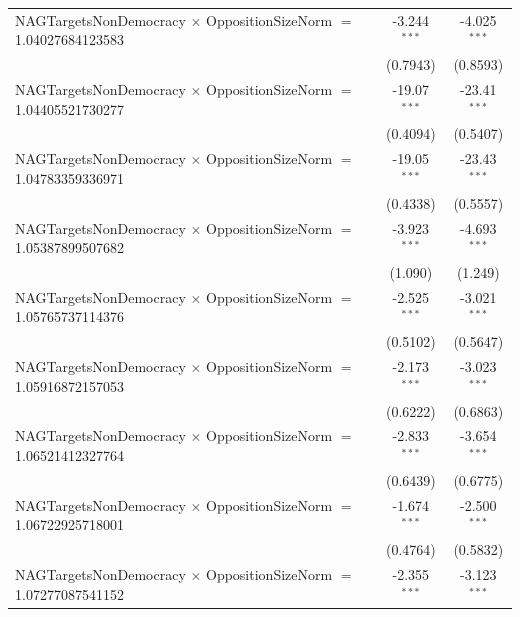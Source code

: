 \begin{tabular}{lcc}
   NAGTargetsNonDemocracy $\times$ OppositionSizeNorm $=$ 1.04027684123583      & -3.244$^{***}$       & -4.025$^{***}$\\   
                                                                                & (0.7943)             & (0.8593)\\   
   NAGTargetsNonDemocracy $\times$ OppositionSizeNorm $=$ 1.04405521730277      & -19.07$^{***}$       & -23.41$^{***}$\\   
                                                                                & (0.4094)             & (0.5407)\\   
   NAGTargetsNonDemocracy $\times$ OppositionSizeNorm $=$ 1.04783359336971      & -19.05$^{***}$       & -23.43$^{***}$\\   
                                                                                & (0.4338)             & (0.5557)\\   
   NAGTargetsNonDemocracy $\times$ OppositionSizeNorm $=$ 1.05387899507682      & -3.923$^{***}$       & -4.693$^{***}$\\   
                                                                                & (1.090)              & (1.249)\\   
   NAGTargetsNonDemocracy $\times$ OppositionSizeNorm $=$ 1.05765737114376      & -2.525$^{***}$       & -3.021$^{***}$\\   
                                                                                & (0.5102)             & (0.5647)\\   
   NAGTargetsNonDemocracy $\times$ OppositionSizeNorm $=$ 1.05916872157053      & -2.173$^{***}$       & -3.023$^{***}$\\   
                                                                                & (0.6222)             & (0.6863)\\   
   NAGTargetsNonDemocracy $\times$ OppositionSizeNorm $=$ 1.06521412327764      & -2.833$^{***}$       & -3.654$^{***}$\\   
                                                                                & (0.6439)             & (0.6775)\\   
   NAGTargetsNonDemocracy $\times$ OppositionSizeNorm $=$ 1.06722925718001      & -1.674$^{***}$       & -2.500$^{***}$\\   
                                                                                & (0.4764)             & (0.5832)\\   
   NAGTargetsNonDemocracy $\times$ OppositionSizeNorm $=$ 1.07277087541152      & -2.355$^{***}$       & -3.123$^{***}$\\   

\end{tabular}
